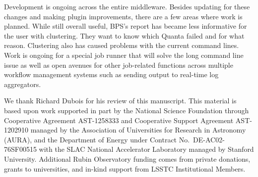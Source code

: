 \documentclass[11pt,twoside]{article}
\begin{document}
Development is ongoing across the entire middleware.  Besides updating
for these changes and making plugin improvements, there are a few areas
where work is planned.  While still overall useful, BPS's report has
became less informative for the user with clustering.  They want to know
which Quanta failed and for what reason.  Clustering also has caused
problems with the current command lines.  Work is ongoing for a special
job runner that will solve the long command line issue as well as open
avenues for other job-related functions across multiple workflow
management systems such as sending output to real-time log aggregators.

\acknowledgements We thank Richard Dubois for his review of this
manuscript.  This material is based upon work supported in part by the
National Science Foundation through Cooperative Agreement AST-1258333
and Cooperative Support Agreement AST-1202910 managed by the Association
of Universities for Research in Astronomy (AURA), and the Department
of Energy under Contract No.\ DE-AC02-76SF00515 with the SLAC National
Accelerator Laboratory managed by Stanford University. Additional Rubin
Observatory funding comes from private donations, grants to universities,
and in-kind support from LSSTC Institutional Members.
\end{document}
